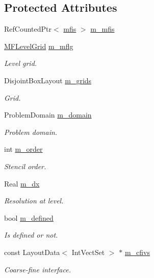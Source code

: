 \subsection*{Protected Attributes}
\begin{DoxyCompactItemize}
\item 
Ref\+Counted\+Ptr$<$ \hyperlink{classmfis}{mfis} $>$ \hyperlink{classjump__bc_a892bf0092729ac5ae0b04a9c61f36bac}{m\+\_\+mfis}
\item 
\hyperlink{classMFLevelGrid}{M\+F\+Level\+Grid} \hyperlink{classjump__bc_a961e7bfeab1734c6efcbf3342921c3e7}{m\+\_\+mflg}
\begin{DoxyCompactList}\small\item\em Level grid. \end{DoxyCompactList}\item 
Disjoint\+Box\+Layout \hyperlink{classjump__bc_a0b157ff79e65adbc11bd935df99d8ab9}{m\+\_\+grids}
\begin{DoxyCompactList}\small\item\em Grid. \end{DoxyCompactList}\item 
Problem\+Domain \hyperlink{classjump__bc_a0cb7cfe80143e5eb5da685cef312b489}{m\+\_\+domain}
\begin{DoxyCompactList}\small\item\em Problem domain. \end{DoxyCompactList}\item 
int \hyperlink{classjump__bc_a18fd4f52c0e9a6a0f48ad900bab6fae5}{m\+\_\+order}
\begin{DoxyCompactList}\small\item\em Stencil order. \end{DoxyCompactList}\item 
Real \hyperlink{classjump__bc_ac0388ba63f118459edf3a17281715900}{m\+\_\+dx}
\begin{DoxyCompactList}\small\item\em Resolution at level. \end{DoxyCompactList}\item 
bool \hyperlink{classjump__bc_a12902b215c91b1bf08dd45cd75aafc27}{m\+\_\+defined}
\begin{DoxyCompactList}\small\item\em Is defined or not. \end{DoxyCompactList}\item 
const Layout\+Data$<$ Int\+Vect\+Set $>$ $\ast$ \hyperlink{classjump__bc_a0c382119800ddd4a2d0553d4a4472cc3}{m\+\_\+cfivs}
\begin{DoxyCompactList}\small\item\em Coarse-\/fine interface. \end{DoxyCompactList}\item 

\end{DoxyCompactItemize}
